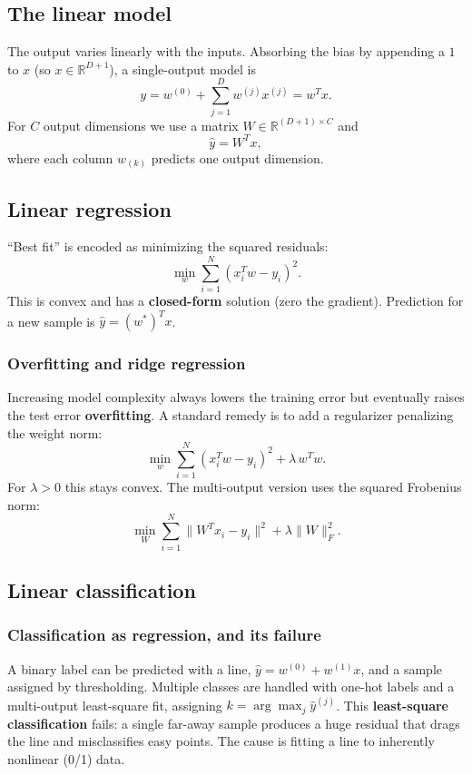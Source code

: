 \subsection{The linear model}
The output varies linearly with the inputs. Absorbing the bias by appending a
$1$ to $x$ (so $x \in \mathbb{R}^{D+1}$), a single-output model is
\[
  y = w^{(0)} + \sum_{j=1}^{D} w^{(j)} x^{(j)} = w^T x .
\]
For $C$ output dimensions we use a matrix $W \in \mathbb{R}^{(D+1)\times C}$ and
\[
  \hat{y} = W^T x ,
\]
where each column $w_{(k)}$ predicts one output dimension.

\subsection{Linear regression}
``Best fit'' is encoded as minimizing the squared residuals:
\[
  \min_{w} \sum_{i=1}^{N} \left(x_i^T w - y_i\right)^2 .
\]
This is convex and has a \textbf{closed-form} solution (zero the gradient).
Prediction for a new sample is $\hat{y} = (w^*)^T x$.

\subsubsection{Overfitting and ridge regression}
Increasing model complexity always lowers the training error but eventually
raises the test error \textrightarrow{} \textbf{overfitting}. A standard remedy
is to add a regularizer penalizing the weight norm:
\[
  \min_{w} \sum_{i=1}^{N} \left(x_i^T w - y_i\right)^2 + \lambda\, w^T w .
\]
For $\lambda > 0$ this stays convex. The multi-output version uses the squared
Frobenius norm:
\[
  \min_{W} \sum_{i=1}^{N} \|W^T x_i - y_i\|^2 + \lambda \|W\|_F^2 .
\]

\subsection{Linear classification}
\subsubsection{Classification as regression, and its failure}
A binary label can be predicted with a line, $\hat{y} = w^{(0)} + w^{(1)} x$, and
a sample assigned by thresholding. Multiple classes are handled with one-hot
labels and a multi-output least-square fit, assigning
$k = \arg\max_j \hat{y}^{(j)}$. This \textbf{least-square classification} fails:
a single far-away sample produces a huge residual that drags the line and
misclassifies easy points. The cause is fitting a line to inherently nonlinear
(0/1) data.

